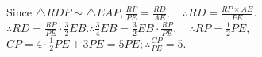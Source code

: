 \documentclass{article}
\begin{document}
Since \(\triangle R D P \sim \triangle E A P, \frac{R P}{P E}=\frac{R D}{A E}, \quad \therefore R D=\frac{R P \times A E}{P E}\).\\
\(\therefore R D=\frac{R P}{P E} \cdot \frac{3}{2} E B . \therefore \frac{3}{4} E B=\frac{3}{2} E B \cdot \frac{R P}{P E}, \quad \therefore R P=\frac{1}{2} P E\), \(C P=4 \cdot \frac{1}{2} P E+3 P E=5 P E ; \therefore \frac{C P}{P E}=5\).
\end{document}
